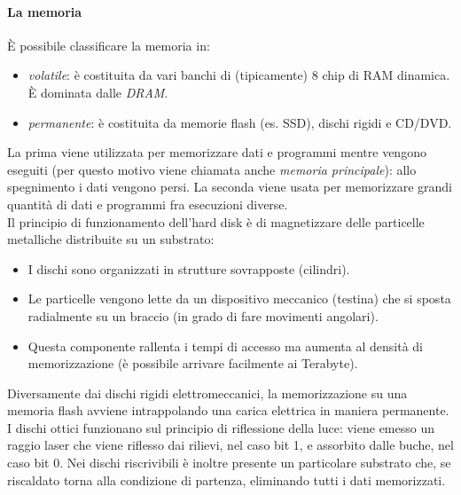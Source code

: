 \documentclass[class=book, crop=false]{standalone}
\begin{document}
\paragraph*{La memoria}
\`{E} possibile classificare la memoria in:
\begin{itemize}[noitemsep]
	\item \emph{volatile}: è costituita da vari banchi di (tipicamente) 8 chip di RAM dinamica. \`{E} dominata dalle \emph{DRAM}.
	\item \emph{permanente}: è costituita da memorie flash (es. SSD), dischi rigidi e CD/DVD.
\end{itemize}
La prima viene utilizzata per memorizzare dati e programmi mentre vengono eseguiti (per questo motivo viene chiamata anche \emph{memoria principale}): allo spegnimento i dati vengono persi. La seconda viene usata per memorizzare grandi quantità di dati e programmi fra esecuzioni diverse.\\
Il principio di funzionamento dell'hard disk è di magnetizzare delle particelle metalliche distribuite su un substrato:
\begin{itemize}[noitemsep]
	\item I dischi sono organizzati in strutture sovrapposte (cilindri).
	\item Le particelle vengono lette da un dispositivo meccanico (testina) che si sposta radialmente su un braccio (in grado di fare movimenti angolari).
	\item Questa componente rallenta i tempi di accesso ma aumenta al densità di memorizzazione (è possibile arrivare facilmente ai Terabyte).
\end{itemize}

Diversamente dai dischi rigidi elettromeccanici, la memorizzazione su una memoria flash avviene intrappolando una carica elettrica in maniera permanente.\\
I dischi ottici funzionano sul principio di riflessione della luce: viene emesso un raggio laser che viene riflesso dai rilievi, nel caso bit 1, e assorbito dalle buche, nel caso bit 0. Nei dischi riscrivibili è inoltre presente un particolare substrato che, se riscaldato torna alla condizione di partenza, eliminando tutti i dati memorizzati.
\end{document}
